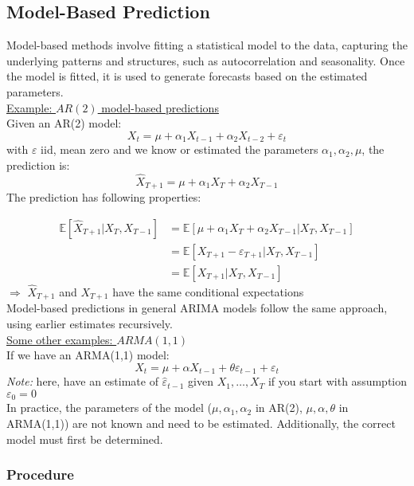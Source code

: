 \subsection{Model-Based Prediction}

Model-based methods involve fitting a statistical model to the data, capturing the underlying patterns and structures, such as autocorrelation and seasonality. Once the model is fitted, it is used to generate forecasts based on the estimated parameters. \\

\underline{Example: $AR(2)$ model-based predictions}\\

Given an AR(2) model: \[X_t=\mu +\alpha_1X_{t-1} + \alpha_2 X_{t-2}+\varepsilon_t\] with $\varepsilon$ iid, mean zero and we know or estimated the parameters $\alpha_1, \alpha_2, \mu$, the prediction is:\[
\hat{X}_{T+1}=\mu +\alpha_1 X_T + \alpha_2 X_{T-1}
\]
The prediction has following properties: 

    \begin{align*}
        \mathbb{E}[\hat{X}_{T+1} | X_T, X_{T-1}] &= \mathbb{E}[\mu+\alpha_1 X_T+\alpha_2 X_{T-1} |X_T, X_{T-1}]\\
        &=\mathbb{E}[X_{T+1}-\varepsilon_{T+1} | X_T, X_{T-1}]\\
        &=\mathbb{E}[X_{T+1} | X_T, X_{T-1}]
    \end{align*}
$\Rightarrow$ $\hat{X}_{T+1}$ and $X_{T+1}$ have the same conditional expectations \\

Model-based predictions in general ARIMA models follow the same approach, using earlier estimates recursively. \\

\underline{Some other examples: $ARMA(1,1)$} \\

If we have an ARMA(1,1) model: 
\[X_t=\mu + \alpha X_{t-1}+\theta \varepsilon_{t-1}+\varepsilon_t \]
\textit{Note:} here, have an estimate of $\hat{\varepsilon}_{t-1} $ given $X_1,\ldots,X_T$ if you start with assumption $\varepsilon_0=0$ \\

In practice, the parameters of the model ($\mu,\alpha_1,\alpha_2$ in AR(2), $\mu,\alpha,\theta$ in ARMA(1,1)) are not known and need to be estimated. Additionally, the correct model must first be determined. 


\subsubsection{Procedure}

